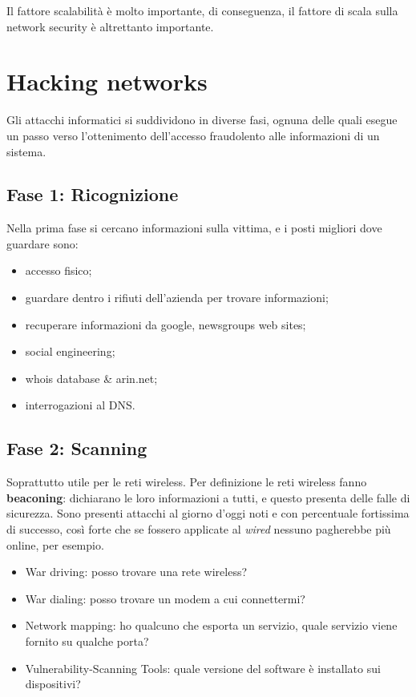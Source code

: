 Il fattore scalabilità è molto importante, di conseguenza, il fattore di scala
sulla network security è altrettanto importante.

\section{Hacking networks}

Gli attacchi informatici si suddividono in diverse fasi, ognuna delle quali
esegue un passo verso l'ottenimento dell'accesso fraudolento alle informazioni
di un sistema.


\subsection{Fase 1: Ricognizione}

Nella prima fase si cercano informazioni sulla vittima, e i posti migliori dove
guardare sono:
\begin{itemize}
 \item accesso fisico;
 \item guardare dentro i rifiuti dell'azienda per trovare informazioni;
 \item recuperare informazioni da google, newsgroups web sites;
 \item social engineering;
 \item whois database \& arin.net;
 \item interrogazioni al DNS.
\end{itemize}

\subsection{Fase 2: Scanning}

Soprattutto utile per le reti wireless. Per definizione le reti wireless fanno
\textbf{beaconing}: dichiarano le loro informazioni a tutti, e questo presenta
delle falle di sicurezza. Sono presenti attacchi al giorno d'oggi noti e con
percentuale fortissima di successo, così forte che se fossero applicate al
\textit{wired} nessuno pagherebbe più online, per esempio.

\begin{itemize}
\item War driving: posso trovare una rete wireless?
\item War dialing: posso trovare un modem a cui connettermi?
\item Network mapping: ho qualcuno che esporta un servizio, quale servizio
viene fornito su qualche porta?
\item Vulnerability-Scanning Tools: quale versione del software è installato
sui dispositivi?
\end{itemize}

